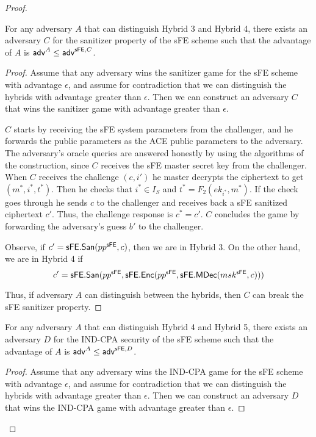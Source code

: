 \documentclass{llncs}
\begin{document}
\begin{proof}
\begin{claim} \label{claim:ACE_nowrite_sFE_san}
For any adversary $A$ that can distinguish Hybrid 3 and Hybrid 4, there exists an adversary $C$ for the sanitizer property of the sFE scheme such that the advantage of $A$ is 
$ \mathsf{adv}^{A} \leq \mathsf{adv}^{\mathsf{sFE},C} $.
\end{claim}

\begin{proof}
Assume that any adversary wins the sanitizer game for the sFE scheme with advantage $\epsilon$, and assume for contradiction that we can distinguish the hybrids with advantage greater than $\epsilon$. Then we can construct an adversary $C$ that wins the sanitizer game with advantage greater than $\epsilon$.

$C$ starts by receiving the sFE system parameters from the challenger, and he forwards the public parameters as the ACE public parameters to the adversary. 
The adversary's oracle queries are answered honestly by using the algorithms of the construction, since $C$ receives the sFE master secret key from the challenger.
When $C$ receives the challenge $(c,i')$ he master decrypts the ciphertext to get $(m^*,i^*,t^*)$. Then he checks that $i^* \in I_S$ and $t^* = F_{2}(ek_{i^*},m^*)$. If the check goes through he sends $c$ to the challenger and receives back a sFE sanitized ciphertext $c'$. Thus, the challenge response is $c^* = c'$. 
$C$ concludes the game by forwarding the adversary's guess $b'$ to the challenger.

Observe, if $c' = \mathsf{sFE}.\mathsf{San}(pp^{\mathsf{sFE}},c)$, then we are in Hybrid 3. On the other hand, we are in Hybrid 4 if $$c' = \mathsf{sFE}.\mathsf{San}(pp^{\mathsf{sFE}},\mathsf{sFE}.\mathsf{Enc}(pp^{\mathsf{sFE}},\mathsf{sFE}.\mathsf{MDec}(msk^{\mathsf{sFE}},c)))$$

Thus, if adversary $A$ can distinguish between the hybrids, then $C$ can break the sFE sanitizer property. 
\end{proof}


\begin{claim} \label{claim:ACE_nowrite_sFE_IND-CPA}
For any adversary $A$ that can distinguish Hybrid 4 and Hybrid 5, there exists an adversary $D$ for the IND-CPA security of the sFE scheme such that the advantage of $A$ is 
$ \mathsf{adv}^{A} \leq \mathsf{adv}^{\mathsf{sFE},D} $.
\end{claim}

\begin{proof}
Assume that any adversary wins the IND-CPA game for the sFE scheme with advantage $\epsilon$, and assume for contradiction that we can distinguish the hybrids with advantage greater than $\epsilon$. Then we can construct an adversary $D$ that wins the IND-CPA game with advantage greater than $\epsilon$.


\end{proof}
\end{proof}
\end{document}
